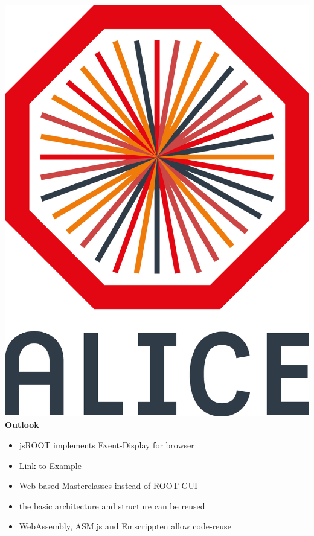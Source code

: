 \documentclass[aspectratio=1610,14pt,dvipsnames]{beamer}
\begin{document}
\begin{frame}{\includegraphics[height=0.07\textheight]{2012-Jul-04-4_Color_Logo_CB.png} \hspace{0.2cm}\textbf{Outlook}}
  \begin{itemize}
    \item jsROOT implements Event-Display for browser
    \item \href{https://root.cern.ch/js/latest/?nobrowser\&json=../files/geom/simple_alice.json.gz\&file=../files/geom/tracks_hits.root\&item=simple_alice.json.gz+tracks_hits.root/tracks;1+tracks_hits.root/hits;1}{Link to Example}
    \item Web-based Masterclasses instead of ROOT-GUI
    \item the basic architecture and structure can be reused
    \item WebAssembly, ASM.js and Emscrippten allow code-reuse
  \end{itemize}
\end{frame}
\end{document}
